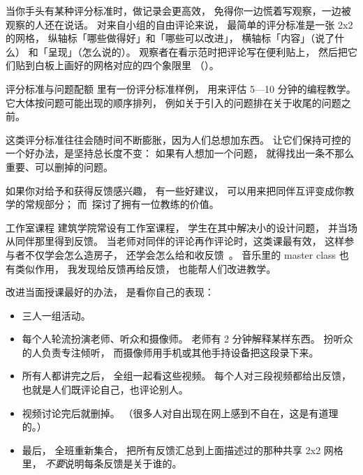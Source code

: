 当你手头有某种评分标准时，做记录会更高效，
免得你一边慌着写观察，一边被观察的人还在说话。
对来自小组的自由评论来说，
最简单的评分标准是一张 2x2 的网格，
纵轴标「哪些做得好」和「哪些可以改进」，
横轴标「内容」（说了什么）
和「呈现」（怎么说的）。
观察者在看示范时把评论写在便利贴上，
然后把它们贴到白板上画好的网格对应的四个象限里
（）。


\begin{aside}{评分标准与问题配额}
  里有一份评分标准样例，
  用来评估 5—10 分钟的编程教学。
  它大体按问题可能出现的顺序排列，
  例如关于引入的问题排在关于收尾的问题之前。

  这类评分标准往往会随时间不断膨胀，因为人们总想加东西。
  让它们保持可控的一个好办法，是坚持总长度不变：
  如果有人想加一个问题，
  就得找出一条不那么重要、可以删掉的问题。
\end{aside}

如果你对给予和获得反馈感兴趣，
\cite{Gorm2014}有一些好建议，
可以用来把同伴互评变成你教学的常规部分；
而~\cite{Gawa2011}探讨了拥有一位教练的价值。

\begin{aside}{工作室课程}
  建筑学院常设有工作室课程，
  学生在其中解决小的设计问题，
  并当场从同伴那里得到反馈。
  当老师对同伴的评论再作评论时，这类课最有效，
  这样参与者不仅学会怎么造房子，
  还学会怎么给和收反馈~\cite{Scho1984}。
  音乐里的 master class 也有类似作用，
  我发现给反馈再给反馈，
  也能帮人们改进教学。
\end{aside}


改进当面授课最好的办法，
是看你自己的表现：

\begin{itemize}

\item
  三人一组活动。

\item
  每个人轮流扮演老师、听众和摄像师。
  老师有 2 分钟解释某样东西。
  扮听众的人负责专注倾听，
  而摄像师用手机或其他手持设备把这段录下来。

\item
  所有人都讲完之后，
  全组一起看这些视频。
  每个人对三段视频都给出反馈，
  也就是人们既评论自己，也评论别人。

\item
  视频讨论完后就删掉。
  （很多人对自出现在网上感到不自在，这是有道理的。）

\item
  最后，
  全班重新集合，
  把所有反馈汇总到上面描述过的那种共享 2x2 网格里，
  \emph{不要}说明每条反馈是关于谁的。

\end{itemize}

